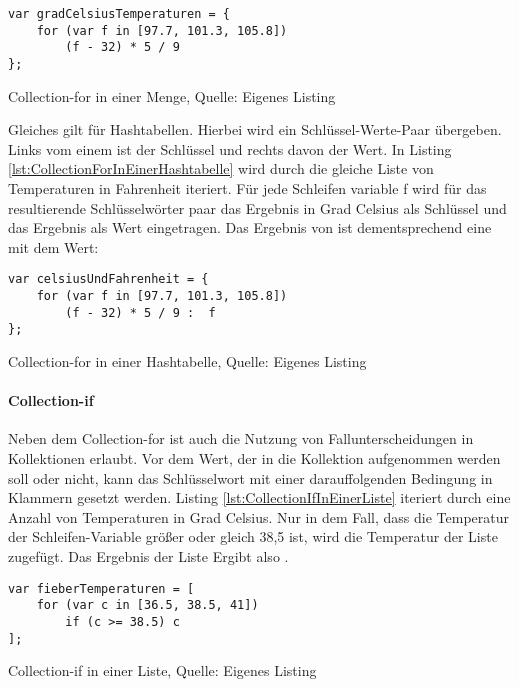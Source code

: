 \ifincludeall
    \begin{listing}[ht]
        \begin{verbatim}
var gradCelsiusTemperaturen = {
    for (var f in [97.7, 101.3, 105.8])
        (f - 32) * 5 / 9
};
\end{verbatim}
        \caption[Collection-for in einer Menge]{Collection-for in einer Menge, Quelle: Eigenes Listing}
        \label{lst:CollectionForInEinerMenge}
    \end{listing}
\fi

Gleiches gilt für Hashtabellen. Hierbei wird ein Schlüssel-Werte-Paar übergeben. Links vom einem \IC{:} ist der Schlüssel und rechts davon der Wert. In Listing \ref{lst:CollectionForInEinerHashtabelle}
wird durch  die gleiche Liste von Temperaturen in Fahrenheit iteriert.  Für jede Schleifen variable f wird für das resultierende Schlüsselwörter paar das Ergebnis in Grad Celsius als Schlüssel und das Ergebnis als Wert eingetragen. Das Ergebnis von  ist dementsprechend eine  mit dem Wert: 

\ifincludeall
    \begin{listing}[ht]
        \begin{verbatim}
var celsiusUndFahrenheit = {
    for (var f in [97.7, 101.3, 105.8])
        (f - 32) * 5 / 9 :  f
};
\end{verbatim}
        \caption[Collection-for in einer Hashtabelle]{Collection-for in einer Hashtabelle, Quelle: Eigenes Listing}
        \label{lst:CollectionForInEinerHashtabelle}
    \end{listing}
\fi

\paragraph{Collection-if}

Neben dem Collection-for ist auch die Nutzung von Fallunterscheidungen in Kollektionen erlaubt. Vor dem Wert, der in die Kollektion aufgenommen werden soll oder nicht,  kann  das Schlüsselwort  mit einer darauffolgenden Bedingung in Klammern gesetzt werden. Listing \ref{lst:CollectionIfInEinerListe} iteriert durch eine Anzahl von Temperaturen in Grad Celsius. Nur in dem Fall, dass die Temperatur der Schleifen-Variable  größer oder gleich 38,5 ist, wird die Temperatur der Liste zugefügt. Das Ergebnis der Liste  Ergibt also \IC{[38.5, 41]}.

\ifincludeall
    \begin{listing}[ht]
        \begin{verbatim}
var fieberTemperaturen = [
    for (var c in [36.5, 38.5, 41])
        if (c >= 38.5) c
];
\end{verbatim}
        \caption[Collection-if in einer Liste]{Collection-if in einer Liste, Quelle: Eigenes Listing}
        \label{lst:CollectionIfInEinerListe}
    \end{listing}
\fi

